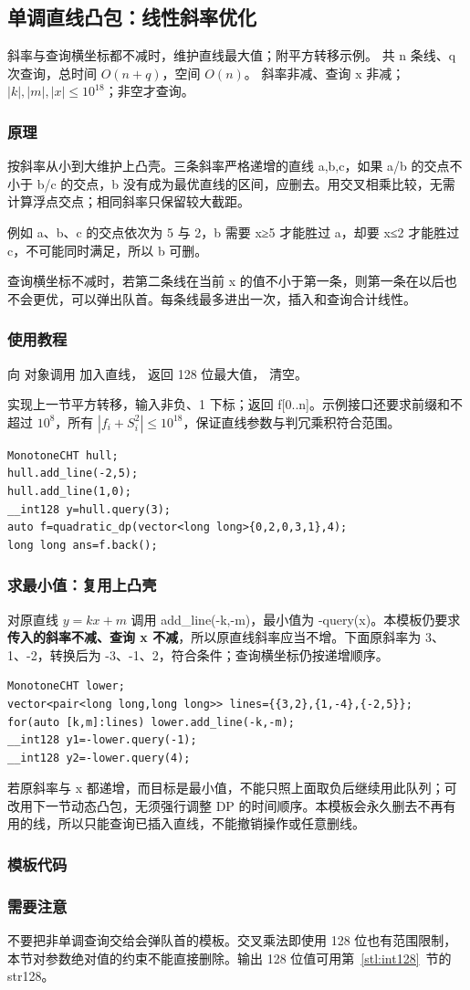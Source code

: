 \subsection{单调直线凸包：线性斜率优化}
\label{dp:monotone-cht}
\AlgorithmInfo
    {斜率与查询横坐标都不减时，维护直线最大值；附平方转移示例。}
    {共 n 条线、q 次查询，总时间 $O(n+q)$，空间 $O(n)$。}
    {斜率非减、查询 x 非减；$|k|,|m|,|x|\le10^{18}$；非空才查询。}
\subsubsection*{原理}

按斜率从小到大维护上凸壳。三条斜率严格递增的直线 a,b,c，如果 a/b 的交点不小于 b/c 的交点，b 没有成为最优直线的区间，应删去。用交叉相乘比较，无需计算浮点交点；相同斜率只保留较大截距。

例如 a、b、c 的交点依次为 5 与 2，b 需要 x≥5 才能胜过 a，却要 x≤2 才能胜过 c，不可能同时满足，所以 b 可删。

查询横坐标不减时，若第二条线在当前 x 的值不小于第一条，则第一条在以后也不会更优，可以弹出队首。每条线最多进出一次，插入和查询合计线性。

\subsubsection*{使用教程}
向  对象调用  加入直线， 返回 128 位最大值， 清空。

 实现上一节平方转移，输入非负、1 下标；返回 f[0..n]。示例接口还要求前缀和不超过 $10^8$，所有 $|f_i+S_i^2|\le10^{18}$，保证直线参数与判冗乘积符合范围。
\begin{lstlisting}[style=mtycpp,numbers=none]
MonotoneCHT hull;
hull.add_line(-2,5);
hull.add_line(1,0);
__int128 y=hull.query(3);
auto f=quadratic_dp(vector<long long>{0,2,0,3,1},4);
long long ans=f.back();
\end{lstlisting}

\subsubsection*{求最小值：复用上凸壳}
对原直线 $y=kx+m$ 调用 add\_line(-k,-m)，最小值为 -query(x)。本模板仍要求\textbf{传入的斜率不减、查询 x 不减}，所以原直线斜率应当不增。下面原斜率为 3、1、-2，转换后为 -3、-1、2，符合条件；查询横坐标仍按递增顺序。
\begin{lstlisting}[style=mtycpp,numbers=none]
MonotoneCHT lower;
vector<pair<long long,long long>> lines={{3,2},{1,-4},{-2,5}};
for(auto [k,m]:lines) lower.add_line(-k,-m);
__int128 y1=-lower.query(-1);
__int128 y2=-lower.query(4);
\end{lstlisting}
若原斜率与 x 都递增，而目标是最小值，不能只照上面取负后继续用此队列；可改用下一节动态凸包，无须强行调整 DP 的时间顺序。本模板会永久删去不再有用的线，所以只能查询已插入直线，不能撤销操作或任意删线。
\subsubsection*{模板代码}
\subsubsection*{需要注意}
不要把非单调查询交给会弹队首的模板。交叉乘法即使用 128 位也有范围限制，本节对参数绝对值的约束不能直接删除。输出 128 位值可用第~\ref{stl:int128}~节的 str128。
